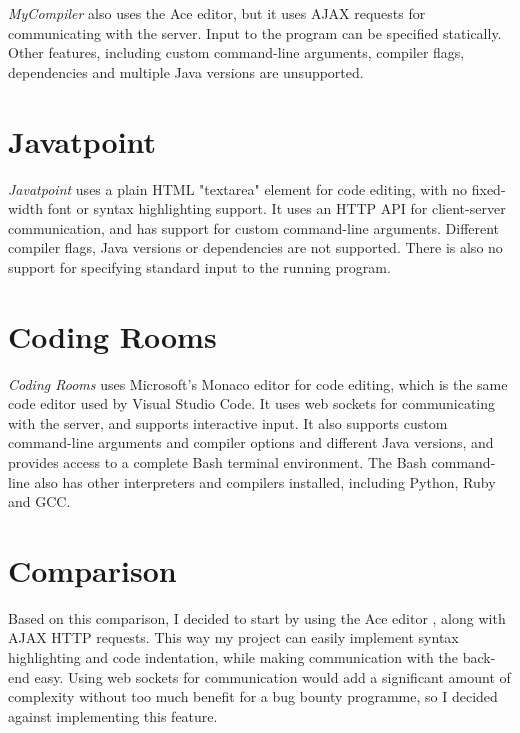 \emph{MyCompiler} \cite{mycompiler-2022} also uses the Ace editor, but it uses AJAX requests for communicating with the server. Input to the program can be specified statically. Other features, including custom command-line arguments, compiler flags, dependencies and multiple Java versions are unsupported.


\section{Javatpoint}

\emph{Javatpoint} \cite{javatpoint-2022} uses a plain HTML "textarea" element for code editing, with no fixed-width font or syntax highlighting support. It uses an HTTP API for client-server communication, and has support for custom command-line arguments. Different compiler flags, Java versions or dependencies are not supported. There is also no support for specifying standard input to the running program.


\section{Coding Rooms}

\emph{Coding Rooms} \cite{coding-rooms-2022} uses Microsoft's Monaco editor for code editing, which is the same code editor used by Visual Studio Code. It uses web sockets for communicating with the server, and supports interactive input. It also supports custom command-line arguments and compiler options and different Java versions, and provides access to a complete Bash terminal environment. The Bash command-line also has other interpreters and compilers installed, including Python, Ruby and GCC.


\section{Comparison}


Based on this comparison, I decided to start by using the Ace editor \cite{mozilla-2022}, along with AJAX HTTP requests. This way my project can easily implement syntax highlighting and code indentation, while making communication with the back-end easy. Using web sockets for communication would add a significant amount of complexity without too much benefit for a bug bounty programme, so I decided against implementing this feature.


